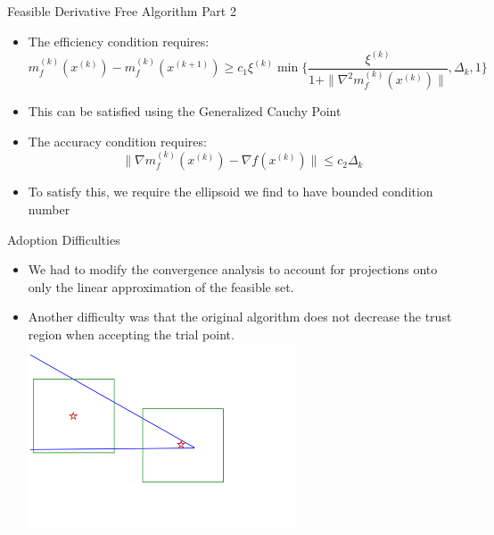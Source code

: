 \documentclass{beamer}
\begin{document}
\begin{frame}{Feasible Derivative Free Algorithm Part 2}
    \begin{itemize}
        \item The efficiency condition requires: $$m_f^{(k)}(x^{(k)}) - m_f^{(k)}(x^{(k+1)}) \ge c_1 \xi^{(k)} \min \{\frac{\xi^{(k)}}{1 + \|\nabla^2 m_f^{(k)}(x^{(k)})\|}, \Delta_k, 1\}$$
        \item This can be satisfied using the Generalized Cauchy Point
        \item The accuracy condition requires: $$\|\nabla m_f^{(k)}(x^{(k)}) - \nabla f (x^{(k)})\| \le c_2 \Delta_k$$
        \item To satisfy this, we require the ellipsoid we find to have bounded condition number
    \end{itemize}
\end{frame}


\begin{frame}{Adoption Difficulties}

\begin{itemize}
    \item We had to modify the convergence analysis to account for projections onto only the linear approximation of the feasible set.
    \item Another difficulty was that the original algorithm does not decrease the trust region when accepting the trial point.
    \includegraphics[width=300px]{images/decrease_required.png}
\end{itemize}


\end{frame}
\end{document}
